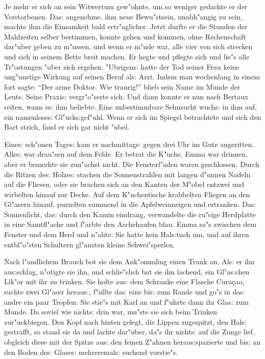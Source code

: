\documentclass[oneside,12pt]{book}
\newcommand{\s}{s:}%
\begin{document}
Je mehr er sich an sein Witwertum gew"ohnte, um so weniger
gedachte er der Verstorbenen. Da{\s} angenehme, ihm neue
Bewu"stsein, unabh"angig zu sein, machte ihm die Einsamkeit bald
ertr"aglicher. Jetzt durfte er die Stunden der Mahlzeiten selber
bestimmen, konnte gehen und kommen, ohne Rechenschaft dar"uber
geben zu m"ussen, und wenn er m"ude war, alle vier von sich
strecken und sich in seinem Bette breit machen. Er hegte und
pflegte sich und lie"s alle Tr"ostungen "uber sich ergehen.
"Ubrigen{\s} hatte der Tod seiner Frau keine ung"unstige Wirkung
auf seinen Beruf al{\s} Arzt. Indem man wochenlang in einem fort
sagte: "`Der arme Doktor. Wie traurig!"' blieb sein Name im Munde
der Leute. Seine Praxi{\s} vergr"o"serte sich. Und dann konnte er
nun nach Bertaux reiten, wann e{\s} ihm beliebte. Eine
unbestimmbare Sehnsucht wuch{\s} in ihm auf, ein namenlose{\s}
Gl"uck{\s}gef"uhl. Wenn er sich im Spiegel betrachtete und sich
den Bart strich, fand er sich gar nicht "ubel.

Eine{\s} sch"onen Tage{\s} kam er nachmittag{\s} gegen drei Uhr im
Gute angeritten. Alle{\s} war drau"sen auf dem Felde. Er betrat
die K"uche. Emma war drinnen, aber er bemerkte sie zun"achst
nicht. Die Fensterl"aden waren geschlossen. Durch die Ritzen
de{\s} Holze{\s} stachen die Sonnenstrahlen mit langen d"unnen
Nadeln auf die Fliesen, oder sie brachen sich an den Kanten der
M"obel ent\/zwei und wirbelten hinauf zur Decke. Auf dem
K"uchentische krabbelten Fliegen an den Gl"asern hinauf, purzelten
summend in die Apfelweinneigen und ertranken. Da{\s} Sonnenlicht,
da{\s} durch den Kamin eindrang, verwandelte die ru"sige
Herdplatte in eine Samtfl"ache und f"arbte den Aschehaufen blau.
Emma sa"s zwischen dem Fenster und dem Herd und n"ahte. Sie hatte
kein Hal{\s}tuch um, und auf ihren entbl"o"sten Schultern
gl"anzten kleine Schwei"sperlen.

Nach l"andlichem Brauch bot sie dem Ank"ommling einen Trunk an.
Al{\s} er ihn au{\s}schlug, n"otigte sie ihn, und schlie"slich bat
sie ihn lachend, ein Gl"a{\s}chen Lik"or mit ihr zu trinken. Sie
holte au{\s} dem Schranke eine Flasche Cura\c{c}ao, suchte zwei
Gl"aser herau{\s}, f"ullte da{\s} eine bi{\s} zum Rande und go"s
in da{\s} andre ein paar Tropfen. Sie stie"s mit Karl an und
f"uhrte dann ihr Gla{\s} zum Munde. Da soviel wie nicht{\s} drin
war, mu"ste sie sich beim Trinken zur"uckbiegen. Den Kopf nach
hinten gelegt, die Lippen zugespitzt, den Hal{\s} gestrafft, so
stand sie da und lachte dar"uber, da"s ihr nicht{\s} auf die Zunge
lief, obgleich diese mit der Spitze au{\s} den feinen Z"ahnen
herau{\s}spazierte und bi{\s} an den Boden de{\s} Glase{\s}
mehreremal{\s} suchend vorstie"s.
\end{document}
